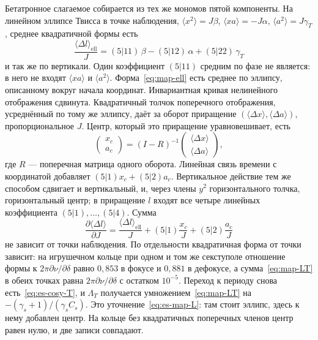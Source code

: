 \documentclass[aps,pra,preprint,a4paper,amsmath,amssymb,longbibliography]{revtex4-2}
\begin{document}
Бетатронное слагаемое собирается из тех же мономов пятой компоненты. На линейном эллипсе Твисса в точке наблюдения, $\langle x^2\rangle=J\beta$, $\langle xa\rangle=-J\alpha$, $\langle a^2\rangle=J\gamma_T$, среднее квадратичной формы есть
\begin{equation}
\label{eq:map-ell}
\frac{\langle\Delta l\rangle_{\mathrm{ell}}}{J}
=
(5|11)\,\beta-(5|12)\,\alpha+(5|22)\,\gamma_T
\end{equation}
и так же по вертикали. Один коэффициент $(5|11)$ средним по фазе не является: в него не входят $\langle xa\rangle$ и $\langle a^2\rangle$. Форма~\eqref{eq:map-ell} есть среднее по эллипсу, описанному вокруг начала координат. Инвариантная кривая нелинейного отображения сдвинута. Квадратичный толчок поперечного отображения, усреднённый по тому же эллипсу, даёт за оборот приращение $(\langle\Delta x\rangle,\langle\Delta a\rangle)$, пропорциональное $J$. Центр, который это приращение уравновешивает, есть
\begin{equation}
\label{eq:map-centre}
\begin{pmatrix}x_c\\ a_c\end{pmatrix}
=
(I-R)^{-1}
\begin{pmatrix}\langle\Delta x\rangle\\ \langle\Delta a\rangle\end{pmatrix},
\end{equation}
где $R$ --- поперечная матрица одного оборота. Линейная связь времени с координатой добавляет $(5|1)x_c+(5|2)a_c$. Вертикальное действие тем же способом сдвигает и вертикальный, и, через члены $y^2$ горизонтального толчка, горизонтальный центр; в приращение $l$ входят все четыре линейных коэффициента $(5|1),\ldots,(5|4)$. Сумма
\begin{equation}
\label{eq:map-LT}
\frac{\partial\langle\Delta l\rangle}{\partial J}
=
\frac{\langle\Delta l\rangle_{\mathrm{ell}}}{J}
+(5|1)\frac{x_c}{J}+(5|2)\frac{a_c}{J}
\end{equation}
не зависит от точки наблюдения. По отдельности квадратичная форма от точки зависит: на игрушечном кольце при одном и том же секступоле отношение формы к $2\pi\partial\nu/\partial\delta$ равно $0{,}853$ в фокусе и $0{,}881$ в дефокусе, а сумма~\eqref{eq:map-LT} в обеих точках равна $2\pi\partial\nu/\partial\delta$ с остатком $10^{-5}$. Переход к периоду снова есть~\eqref{eq:es-cosy-T}, и $\Lambda_T$ получается умножением~\eqref{eq:map-LT} на $-(\gamma_s+1)/(\gamma_s C_s)$. Это уточнение~\eqref{eq:es-map-L}: там стоит эллипс, здесь к нему добавлен центр. На кольце без квадратичных поперечных членов центр равен нулю, и две записи совпадают.
\end{document}
